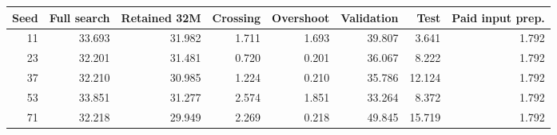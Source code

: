\begin{tabular}{@{}rrrrrrrr@{}}
\toprule
Seed & Full search & Retained 32M & Crossing & Overshoot & Validation & Test & Paid input prep.\\
\midrule
11 & 33.693 & 31.982 & 1.711 & 1.693 & 39.807 & 3.641 & 1.792\\
23 & 32.201 & 31.481 & 0.720 & 0.201 & 36.067 & 8.222 & 1.792\\
37 & 32.210 & 30.985 & 1.224 & 0.210 & 35.786 & 12.124 & 1.792\\
53 & 33.851 & 31.277 & 2.574 & 1.851 & 33.264 & 8.372 & 1.792\\
71 & 32.218 & 29.949 & 2.269 & 0.218 & 49.845 & 15.719 & 1.792\\
\bottomrule
\end{tabular}
